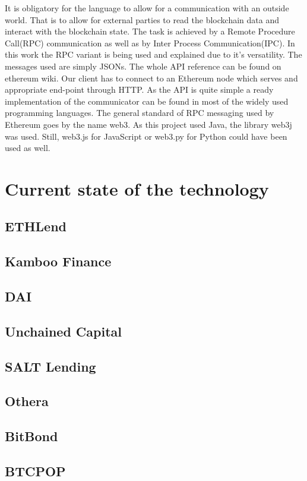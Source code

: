 \documentclass[a4paper,12pt,twoside,openany]{report}
\begin{document}
It is obligatory for the language to allow for a communication with an outside world. That is to allow for external parties to read the blockchain data and interact with the blockchain state. The task is achieved by a Remote Procedure Call(RPC) communication as well as by Inter Process Communication(IPC). In this work the RPC variant is being used and explained due to it's versatility. The messages used are simply JSONs. The whole API reference can be found on ethereum wiki. \cite{RPC} Our client has to connect to an Ethereum node which serves and appropriate end-point through HTTP. As the API is quite simple a ready implementation of the communicator can be found in most of the widely used programming languages. The general standard of RPC messaging used by Ethereum goes by the name web3. As this project used Java, the library web3j was used. Still, web3.js for JavaScript or web3.py for Python could have been used as well.

\chapter{Current state of the technology}

\section{ETHLend}
\section{Kamboo Finance}
\section{DAI}
\section{Unchained Capital}
\section{SALT Lending}
\section{Othera}
\section{BitBond}
\section{BTCPOP}
\end{document}
